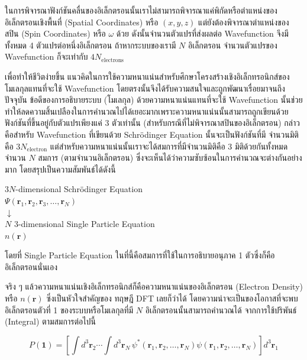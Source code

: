 ในการพิจารณาฟังก์ชันคลื่นของอิเล็กตรอนนั้นเราไม่สามารถพิจารณาแค่พิกัดหรือตำแหน่งของอิเล็กตรอนเชิงพื้นที่ (Spatial Coordinates) หรือ
$(x, y, z)$ แต่ยังต้องพิจารณาตำแหน่งของสปิน (Spin Coordinates) หรือ $\omega$ ด้วย ดังนั้นจำนวนตัวแปรที่ส่งผลต่อ Wavefunction
จึงมีทั้งหมด 4 ตัวแปรต่อหนึ่งอิเล็กตรอน ถ้าหากระบบของเรามี $N$ อิเล็กตรอน จำนวนตัวแปรของ Wavefunction ก็จะเท่ากับ
$4 N_{\text{electrons}}$

เพื่อทำให้ชีวิตง่ายขึ้น แนวคิดในการใช้ความหนาแน่นสำหรับศึกษาโครงสร้างเชิงอิเล็กทรอนิกส์ของโมเลกุลแทนที่จะใช้ Wavefunction
โดยตรงนั้นจึงได้รับความสนใจและถูกพัฒนาเรื่อยมาจนถึงปัจจุบัน ข้อดีของการอธิบายระบบ (โมเลกุล) ด้วยความหนาแน่นแทนที่จะใช้ Wavefunction
นั้นช่วยทำให้ลดความสิ้นเปลืองในการคำนวณไปได้เยอะมากเพราะความหนาแน่นนั้นสามารถถูกเขียนด้วยฟังก์ชันที่ขึ้นอยู่กับตัวแปรเพียงแค่ 3 ตัวเท่านั้น
(สำหรับกรณีที่ไม่พิจารณาสปินของอิเล็กตรอน) กล่าวคือสำหรับ Wavefunction ที่เขียนด้วย Schr\"{o}dinger Equation นั้นจะเป็นฟังก์ชันที่มี%
จำนวนมิติคือ $3N_{\text{electron}}$ แต่สำหรับความหนาแน่นนั้นเราจะได้สมการที่มีจำนวนมิติคือ 3 มิติด้วยกันทั้งหมดจำนวน $N$ สมการ
(ตามจำนวนอิเล็กตรอน) ซึ่งจะเห็นได้ว่าความซับซ้อนในการคำนวณจะต่างกันอย่างมาก โดยสรุปเป็นความสัมพันธ์ได้ดังนี้

\begin{framed}
    \centering
    $3N$-dimensional Schr\"{o}dinger Equation \\
    $\Psi(\bm{r}_{1}, \bm{r}_{2}, \bm{r}_{3}, \dots, \bm{r}_{N})$ \\
    $\downarrow$ \\
    $N$ $3$-dimensional Single Particle Equation \\
    $n({\bm{r}})$
\end{framed}

\noindent โดยที่ Single Particle Equation ในที่นี้คือสมการที่ใช้ในการอธิบายอนุภาค 1 ตัวซึ่งก็คืออิเล็กตรอนนั่นเอง

จริง ๆ แล้วความหนาแน่นเชิงอิเล็กทรอนิกส์ก็คือความหนาแน่นของอิเล็กตรอน (Electron Density) หรือ $n(\bm{r})$ ซึ่งเป็นหัวใจสำคัญของ%
ทฤษฎี DFT เลยก็ว่าได้ โดยความน่าจะเป็นของโอกาสที่จะพบอิเล็กตรอนตัวที่ 1 ของระบบหรือโมเลกุลที่มี $N$ อิเล็กตรอนนั้นสามารถคำนวณได้%
จากการใช้ปริพันธ์ (Integral) ตามสมการต่อไปนี้

\begin{equation}\label{eq:elec_prob_density_1e}
    P(\bm{1}) = \left [ \int {d}^{3} \bm{r}_{2} \cdots \int {d}^{3} \bm{r}_{N} \,
        \psi^*(\bm{r}_{1}, \bm{r}_{2}, \dots, \bm{r}_{N}) \psi(\bm{r}_{1}, \bm{r}_2,
        \dots, \bm{r}_N) \right ] {d}^{3} \bm{r}_{1}
\end{equation}

